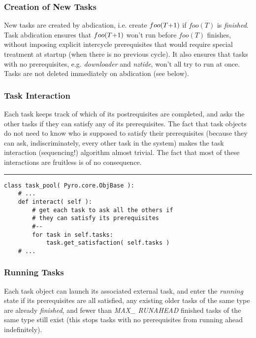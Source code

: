 \documentclass[11pt,a4paper]{article}
\begin{document}
\subsubsection{Creation of New Tasks}

New tasks are created by abdication, i.e. create $foo(T\negmedspace
+\negmedspace 1)$ if $foo(T)$ is {\em finished}.  Task abdication
ensures that $foo(T\negmedspace +\negmedspace 1)$ won't run before
$foo(T)$ finishes, without imposing explicit intercycle prerequisites
that would require special treatment at startup (when there is no
previous cycle).  It also ensures that tasks with no prerequisites, e.g.
{\em downloader} and {\em nztide}, won't all try to run at once.
Tasks are not deleted immediately on abdication (see below).


\subsubsection{Task Interaction} 

Each task keeps track of which of its postrequisites are completed, and
asks the other tasks if they can satisfy any of its prerequisites.  The
fact that task objects do not need to know who is supposed to satisfy
their prerequisites (because they can ask, indiscriminately, every other
task in the system) makes the task interaction (sequencing!) algorithm
almost trivial. The fact that most of these interactions are fruitless
is of no consequence. 

{\small
\noindent
\rule{5cm}{.2mm}
\begin{lstlisting}
class task_pool( Pyro.core.ObjBase ):
    # ...
    def interact( self ):
        # get each task to ask all the others if 
        # they can satisfy its prerequisites
        #--
        for task in self.tasks:
            task.get_satisfaction( self.tasks )
    # ...
\end{lstlisting}
}

\subsubsection{Running Tasks}

Each task object can launch its associated external task, and enter the
{\em running} state if its prerequisites are all satisfied, any existing
older tasks of the same type are already {\em finished}, and fewer than
{\em MAX\_ RUNAHEAD} finished tasks of the same type still exist (this
stops tasks with no prerequisites from running ahead indefinitely).
\end{document}
